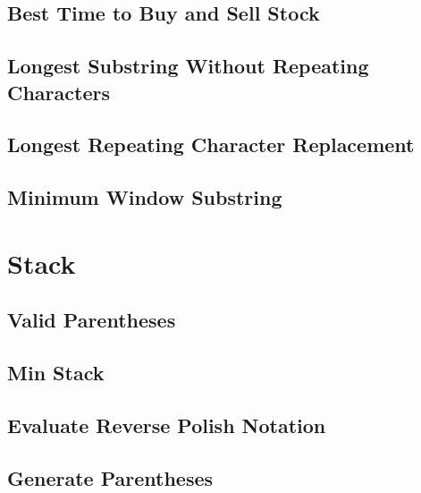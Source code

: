 \documentclass[12pt,letterpaper]{book}
\theoremstyle{definition}
\theoremstyle{remark}
\begin{document}
\section{Best Time to Buy and Sell Stock}


\section{Longest Substring Without Repeating Characters}


\section{Longest Repeating Character Replacement}


\section{Minimum Window Substring}


\chapter{Stack}

\section{Valid Parentheses}


\section{Min Stack}


\section{Evaluate Reverse Polish Notation}


\section{Generate Parentheses}
\end{document}
